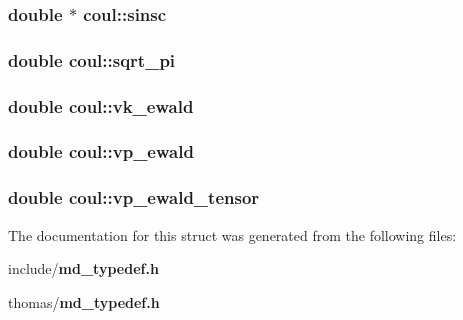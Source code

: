 \subsubsection{\setlength{\rightskip}{0pt plus 5cm}double $\ast$ {\bf coul::sinsc}}\label{structcoul_678ddc19972d3a37759db13030700258}


\subsubsection{\setlength{\rightskip}{0pt plus 5cm}double {\bf coul::sqrt\_\-pi}}\label{structcoul_99bfa66ce1e59e8928ed358db4df63d0}


\subsubsection{\setlength{\rightskip}{0pt plus 5cm}double {\bf coul::vk\_\-ewald}}\label{structcoul_cd974251ce49be3b82d7f740ec152cdf}


\subsubsection{\setlength{\rightskip}{0pt plus 5cm}double {\bf coul::vp\_\-ewald}}\label{structcoul_25d31c548846859cdf86d05f2a6d99ba}


\subsubsection{\setlength{\rightskip}{0pt plus 5cm}double {\bf coul::vp\_\-ewald\_\-tensor}}\label{structcoul_051d1f069694fcec7aaa3109726be664}




The documentation for this struct was generated from the following files:\begin{CompactItemize}
\item 
include/{\bf md\_\-typedef.h}\item 
thomas/{\bf md\_\-typedef.h}\end{CompactItemize}
